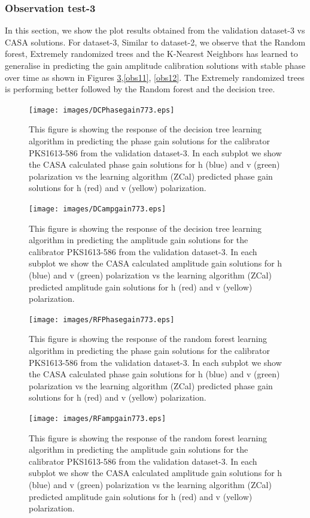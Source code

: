 \subsubsection{Observation test-3}
In this section, we show the plot results obtained from the validation dataset-3 vs CASA solutions. For dataset-3, Similar to dataset-2, we observe that the Random forest, Extremely randomized trees and the K-Nearest Neighbors has learned to generalise in predicting the gain amplitude calibration solutions with stable phase over time as shown in Figures \ref{obs10},\ref{obs11}, \ref{obs12}. The Extremely randomized trees is performing better followed by the Random forest and the decision tree.
\begin{figure}[H]
    \texttt{[image: images/DCPhasegain773.eps]}
    \caption{This figure is showing the response of the decision tree learning algorithm in predicting the phase gain solutions for the calibrator PKS1613-586 from the validation dataset-3. In each subplot we show the CASA calculated phase gain solutions for h (blue) and v (green) polarization vs the learning algorithm (ZCal) predicted phase gain solutions for h (red) and v (yellow) polarization.}
    \label{obs9}
\end{figure}

\begin{figure}[H]
    \texttt{[image: images/DCampgain773.eps]}
    \caption{This figure is showing the response of the decision tree learning algorithm in predicting the amplitude gain solutions for the calibrator PKS1613-586 from the validation dataset-3. In each subplot we show the CASA calculated amplitude gain solutions for h (blue) and v (green) polarization vs the learning algorithm (ZCal) predicted amplitude gain solutions for h (red) and v (yellow) polarization.}
     \label{da3}
\end{figure}


\begin{figure}[H]
    \texttt{[image: images/RFPhasegain773.eps]}
    \caption{This figure is showing the response of the random forest learning algorithm in predicting the phase gain solutions for the calibrator PKS1613-586 from the validation dataset-3. In each subplot we show the CASA calculated phase gain solutions for h (blue) and v (green) polarization vs the learning algorithm (ZCal) predicted phase gain solutions for h (red) and v (yellow) polarization.}
    \label{obs10}
\end{figure}

\begin{figure}[H]
    \texttt{[image: images/RFampgain773.eps]}
    \caption{This figure is showing the response of the random forest learning algorithm in predicting the amplitude gain solutions for the calibrator PKS1613-586 from the validation dataset-3. In each subplot we show the CASA calculated amplitude gain solutions for h (blue) and v (green) polarization vs the learning algorithm (ZCal) predicted amplitude gain solutions for h (red) and v (yellow) polarization.}
     \label{ra3}
\end{figure}

